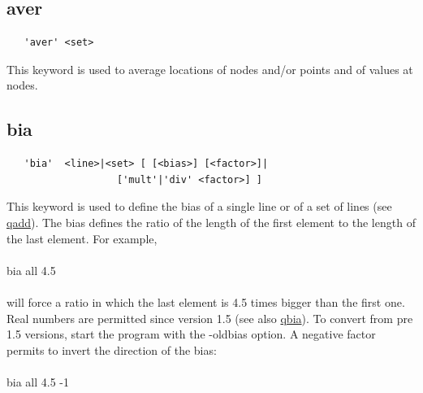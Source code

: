 \documentclass{article}
\providecommand{\htmlref}[2]{\hyperref[#2]{#1}}
\begin{document}
\subsection{\label{aver}aver}
\begin{verbatim}
   'aver' <set>
\end{verbatim}
This keyword is used to average locations of nodes and/or points and of values at nodes.

\subsection{\label{bia}bia}
\begin{verbatim}
   'bia'  <line>|<set> [ [<bias>] [<factor>]|
                   ['mult'|'div' <factor>] ]
\end{verbatim}
This keyword is used to define the bias of a single line or of a set of lines (see \htmlref{qadd}{qadd}). The bias defines the ratio of the length of the first element to the length of the last element. For example,\\\\
bia all 4.5\\\\will force a ratio in which the last element is 4.5 times bigger than the first one. Real numbers are permitted since version 1.5 (see also \htmlref{qbia}{qbia}). To convert from pre 1.5 versions, start the program with the -oldbias option. A negative factor permits to invert the direction of the bias: \\\\
bia all 4.5 -1\\\\
\end{document}
